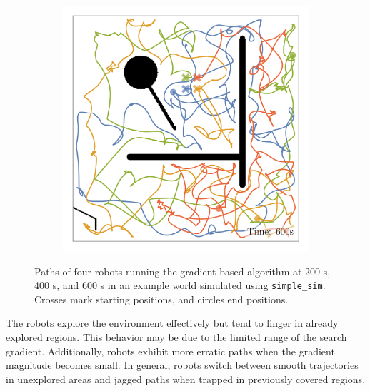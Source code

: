 \begin{figure}[H]
\begin{subfigure}[b]{\w}
    \end{subfigure}
    \begin{subfigure}[b]{\w}
        \centering
        \includegraphics[width=\textwidth]{./figures/plots/paths/search:gradient-paths-(after-600s).png}
    \end{subfigure}
    \caption{Paths of four robots running the gradient-based algorithm at 200 s, 400 s, and 600 s in an example
    world simulated using \texttt{simple\_sim}. Crosses mark starting positions, and circles end positions.}
    \label{fig:gradient-paths}
\end{figure}

The robots explore the environment effectively but tend to linger in already explored regions. This behavior may be due to the limited range of the search gradient. Additionally, robots exhibit more erratic paths when the gradient magnitude becomes small. In general, robots switch between smooth trajectories in unexplored areas and jagged paths when trapped in previously covered regions.\\

